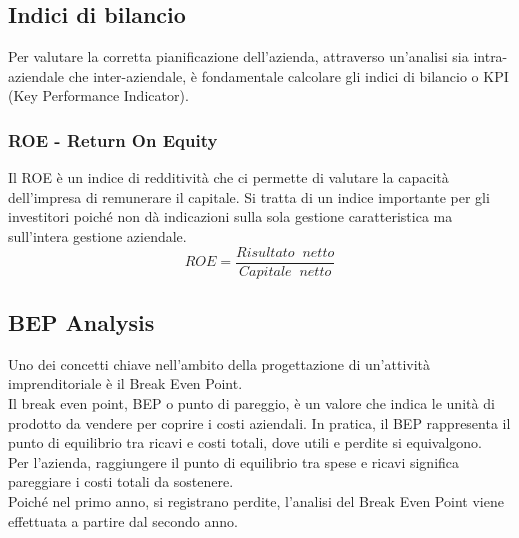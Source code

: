 \documentclass[12pt, a4paper]{article}
\newcommand{\meskip}{\medskip \\}
\begin{document}
\subsection{Indici di bilancio}
Per valutare la corretta pianificazione dell'azienda, attraverso un'analisi sia intra- aziendale che inter-aziendale, è fondamentale calcolare gli indici di bilancio o KPI (Key Performance Indicator).

\subsubsection*{ROE - Return On Equity}
Il ROE è un indice di redditività che ci permette di valutare la capacità dell'impresa di remunerare il capitale. Si tratta di un indice importante per gli investitori poiché non dà indicazioni sulla sola gestione caratteristica ma sull'intera gestione aziendale.
$$ ROE = \frac{Risultato \;\; netto}{Capitale \;\; netto}$$

\subsection{BEP Analysis}
Uno dei concetti chiave nell'ambito della progettazione di un'attività imprenditoriale è il Break Even Point.\meskip
Il break even point, BEP o punto di pareggio, è un valore che indica le unità di prodotto da vendere per coprire i costi aziendali. In pratica, il BEP rappresenta il punto di equilibrio tra ricavi e costi totali, dove utili e perdite si equivalgono.\meskip
Per l'azienda, raggiungere il punto di equilibrio tra spese e ricavi significa pareggiare i costi totali da sostenere. \meskip
Poiché nel primo anno,  si registrano perdite, l'analisi del Break Even Point viene effettuata a partire dal secondo anno.
\end{document}
